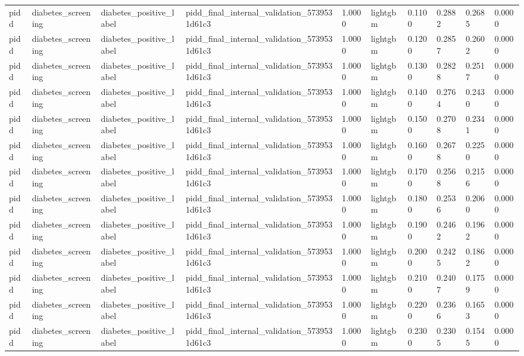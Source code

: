 \begin{tabular}{llllllllll}
pidd & diabetes\_screening & diabetes\_positive\_label & pidd\_final\_internal\_validation\_5739531d61c3 & 1.0000 & lightgbm & 0.1100 & 0.2882 & 0.2685 & 0.0000 \\
pidd & diabetes\_screening & diabetes\_positive\_label & pidd\_final\_internal\_validation\_5739531d61c3 & 1.0000 & lightgbm & 0.1200 & 0.2857 & 0.2602 & 0.0000 \\
pidd & diabetes\_screening & diabetes\_positive\_label & pidd\_final\_internal\_validation\_5739531d61c3 & 1.0000 & lightgbm & 0.1300 & 0.2828 & 0.2517 & 0.0000 \\
pidd & diabetes\_screening & diabetes\_positive\_label & pidd\_final\_internal\_validation\_5739531d61c3 & 1.0000 & lightgbm & 0.1400 & 0.2764 & 0.2430 & 0.0000 \\
pidd & diabetes\_screening & diabetes\_positive\_label & pidd\_final\_internal\_validation\_5739531d61c3 & 1.0000 & lightgbm & 0.1500 & 0.2708 & 0.2341 & 0.0000 \\
pidd & diabetes\_screening & diabetes\_positive\_label & pidd\_final\_internal\_validation\_5739531d61c3 & 1.0000 & lightgbm & 0.1600 & 0.2678 & 0.2250 & 0.0000 \\
pidd & diabetes\_screening & diabetes\_positive\_label & pidd\_final\_internal\_validation\_5739531d61c3 & 1.0000 & lightgbm & 0.1700 & 0.2568 & 0.2156 & 0.0000 \\
pidd & diabetes\_screening & diabetes\_positive\_label & pidd\_final\_internal\_validation\_5739531d61c3 & 1.0000 & lightgbm & 0.1800 & 0.2536 & 0.2060 & 0.0000 \\
pidd & diabetes\_screening & diabetes\_positive\_label & pidd\_final\_internal\_validation\_5739531d61c3 & 1.0000 & lightgbm & 0.1900 & 0.2462 & 0.1962 & 0.0000 \\
pidd & diabetes\_screening & diabetes\_positive\_label & pidd\_final\_internal\_validation\_5739531d61c3 & 1.0000 & lightgbm & 0.2000 & 0.2425 & 0.1862 & 0.0000 \\
pidd & diabetes\_screening & diabetes\_positive\_label & pidd\_final\_internal\_validation\_5739531d61c3 & 1.0000 & lightgbm & 0.2100 & 0.2407 & 0.1759 & 0.0000 \\
pidd & diabetes\_screening & diabetes\_positive\_label & pidd\_final\_internal\_validation\_5739531d61c3 & 1.0000 & lightgbm & 0.2200 & 0.2366 & 0.1653 & 0.0000 \\
pidd & diabetes\_screening & diabetes\_positive\_label & pidd\_final\_internal\_validation\_5739531d61c3 & 1.0000 & lightgbm & 0.2300 & 0.2305 & 0.1545 & 0.0000 \\

\end{tabular}
